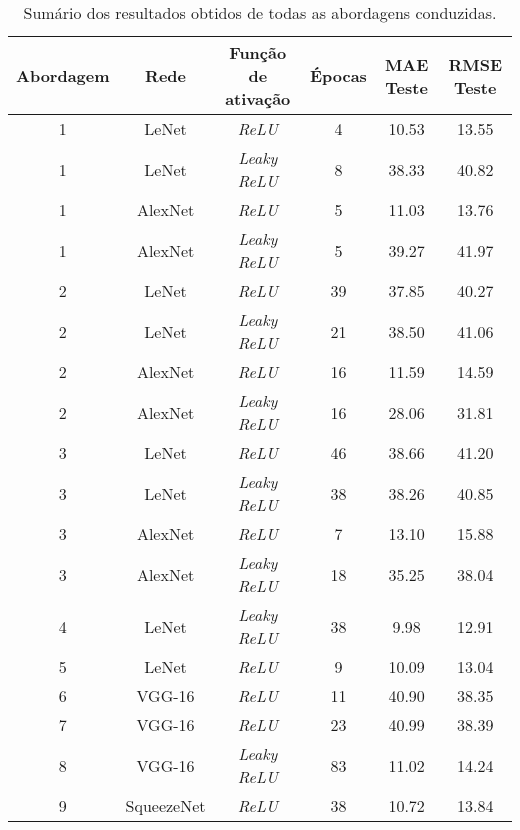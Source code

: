 \begin{table}[b]
	\caption{Sumário dos resultados obtidos de todas as abordagens conduzidas.}
	\label{tab:resultsAll}
  \begin{center}
	\resizebox{0.68\linewidth}{!} {
		\begin{tabular}{cccccc}
			\toprule
			Abordagem & Rede & Função de ativação & Épocas & MAE Teste & RMSE Teste \\
			\midrule
			1 & LeNet & \emph{ReLU}  & 4 & 10.53 & 13.55 \\
			1 & LeNet & \emph{Leaky ReLU} & 8 & 38.33 & 40.82 \\
			1 & AlexNet & \emph{ReLU}  & 5 & 11.03 & 13.76 \\
			1 & AlexNet & \emph{Leaky ReLU} & 5 & 39.27 & 41.97 \\
			2 & LeNet & \emph{ReLU}  & 39 & 37.85 & 40.27 \\
			2 & LeNet & \emph{Leaky ReLU} & 21 & 38.50 & 41.06 \\
			2 & AlexNet & \emph{ReLU}  & 16 & 11.59 & 14.59 \\
			2 & AlexNet & \emph{Leaky ReLU} & 16 & 28.06 & 31.81 \\
			3 & LeNet & \emph{ReLU} & 46 &  38.66 & 41.20 \\
			3 & LeNet & \emph{Leaky ReLU} &  38 & 38.26 & 40.85 \\
			3 & AlexNet & \emph{ReLU} & 7 & 13.10 & 15.88 \\
			3 & AlexNet & \emph{Leaky ReLU} & 18 & 35.25 & 38.04 \\
			4 &	LeNet & \emph{Leaky ReLU} & 38 & 9.98 & 12.91 \\
			5 & LeNet & \emph{ReLU} & 9 &  10.09 & 13.04 \\
			6 & VGG-16 & \emph{ReLU} & 11 & 40.90 & 38.35 \\
			7 & VGG-16 & \emph{ReLU} & 23 & 40.99 & 38.39 \\
			8 & VGG-16 & \emph{Leaky ReLU} & 83 & 11.02 & 14.24 \\
			9 & SqueezeNet & \emph{ReLU} & 38 & 10.72 & 13.84 \\
			\bottomrule
		\end{tabular}
		}
  \end{center}
\end{table}
